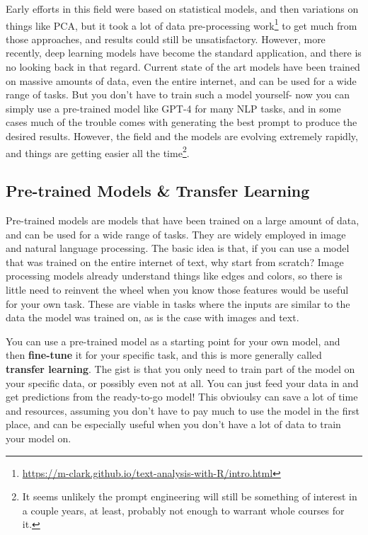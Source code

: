 \documentclass[
  letterpaper,
]{krantz}
\DeclareRobustCommand{\href}[2]{#2\footnote{\url{#1}}}
\begin{document}
Early efforts in this field were based on statistical models, and then
variations on things like PCA, but it took a lot of
\href{https://m-clark.github.io/text-analysis-with-R/intro.html}{data
pre-processing work} to get much from those approaches, and results
could still be unsatisfactory. However, more recently, deep learning
models have become the standard application, and there is no looking
back in that regard. Current state of the art models have been trained
on massive amounts of data, even the entire internet, and can be used
for a wide range of tasks. But you don't have to train such a model
yourself- now you can simply use a pre-trained model like GPT-4 for many
NLP tasks, and in some cases much of the trouble comes with generating
the best prompt to produce the desired results. However, the field and
the models are evolving extremely rapidly, and things are getting easier
all the time\footnote{It seems unlikely the prompt engineering will
  still be something of interest in a couple years, at least, probably
  not enough to warrant whole courses for it.}.

\subsection{Pre-trained Models \& Transfer
Learning}\label{pre-trained-models-transfer-learning}

Pre-trained models are models that have been trained on a large amount
of data, and can be used for a wide range of tasks. They are widely
employed in image and natural language processing. The basic idea is
that, if you can use a model that was trained on the entire internet of
text, why start from scratch? Image processing models already understand
things like edges and colors, so there is little need to reinvent the
wheel when you know those features would be useful for your own task.
These are viable in tasks where the inputs are similar to the data the
model was trained on, as is the case with images and text.

You can use a pre-trained model as a starting point for your own model,
and then \textbf{fine-tune} it for your specific task, and this is more
generally called \textbf{transfer learning}. The gist is that you only
need to train part of the model on your specific data, or possibly even
not at all. You can just feed your data in and get predictions from the
ready-to-go model! This obvioulsy can save a lot of time and resources,
assuming you don't have to pay much to use the model in the first place,
and can be especially useful when you don't have a lot of data to train
your model on.
\end{document}

